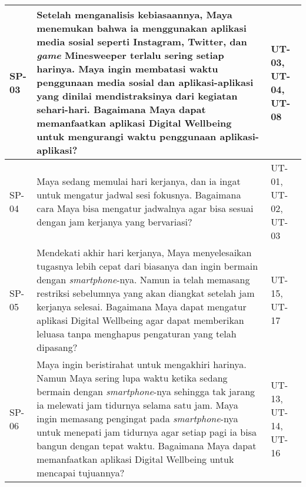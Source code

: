 \begin{footnotesize}
\begin{longtable}[c]{|W{c}{0.07\textwidth}|>{\ccnormspacing}m{0.6\textwidth}|>{\ccnormspacingcenter}m{0.24\textwidth}|}
  SP-03 & Setelah menganalisis kebiasaannya, Maya menemukan bahwa ia menggunakan aplikasi media sosial seperti Instagram, Twitter, dan \textit{game} Minesweeper terlalu sering setiap harinya. Maya ingin membatasi waktu penggunaan media sosial dan aplikasi-aplikasi yang dinilai mendistraksinya dari kegiatan sehari-hari. Bagaimana Maya dapat memanfaatkan aplikasi Digital Wellbeing untuk mengurangi waktu penggunaan aplikasi-aplikasi? & UT-03, UT-04, UT-08 \\ \hline

  SP-04  & Maya sedang memulai hari kerjanya, dan ia ingat untuk mengatur jadwal sesi fokusnya. Bagaimana cara Maya bisa mengatur jadwalnya agar bisa sesuai dengan jam kerjanya yang bervariasi? & UT-01, UT-02, UT-03 \\ \hline
  
  SP-05  & Mendekati akhir hari kerjanya, Maya menyelesaikan tugasnya lebih cepat dari biasanya dan ingin bermain dengan \textit{smartphone}-nya. Namun ia telah memasang restriksi sebelumnya yang akan diangkat setelah jam kerjanya selesai. Bagaimana Maya dapat mengatur aplikasi Digital Wellbeing agar dapat memberikan leluasa tanpa menghapus pengaturan yang telah dipasang? & UT-15, UT-17 \\ \hline
  
  SP-06  & Maya ingin beristirahat untuk mengakhiri harinya. Namun Maya sering lupa waktu ketika sedang bermain dengan \textit{smartphone}-nya sehingga tak jarang ia melewati jam tidurnya selama satu jam. Maya ingin memasang pengingat pada \textit{smartphone}-nya untuk menepati jam tidurnya agar setiap pagi ia bisa bangun dengan tepat waktu. Bagaimana Maya dapat memanfaatkan aplikasi Digital Wellbeing untuk mencapai tujuannya? & UT-13, UT-14, UT-16 \\ \hline
\end{longtable}
\end{footnotesize}
\justifying
\FloatBarrier
